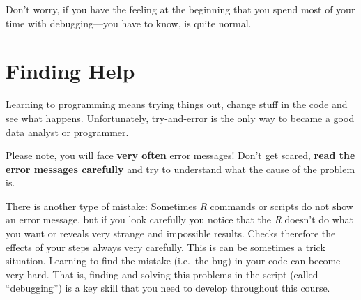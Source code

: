 \documentclass[
]{scrartcl}
\begin{document}
Don't worry, if you have the feeling at the beginning that you spend most of your time with debugging---you have to know, is quite normal.

\hypertarget{findinghelp}{%
\section{Finding Help}\label{findinghelp}}

Learning to programming means trying things out, change stuff in the code and see what happens. Unfortunately, try-and-error is the only way to became a good data analyst or programmer.

Please note, you will face \textbf{very often} error messages! Don't get scared, \textbf{read the error messages carefully} and try to understand what the cause of the problem is.

There is another type of mistake: Sometimes \emph{R} commands or scripts do not show an error message, but if you look carefully you notice that the \emph{R} doesn't do what you want or reveals very strange and impossible results. Checks therefore the effects of your steps always very carefully. This is can be sometimes a trick situation. Learning to find the mistake (i.e.~the bug) in your code can become very hard. That is, finding and solving this problems in the script (called ``debugging'') is a key skill that you need to develop throughout this course.
\end{document}
